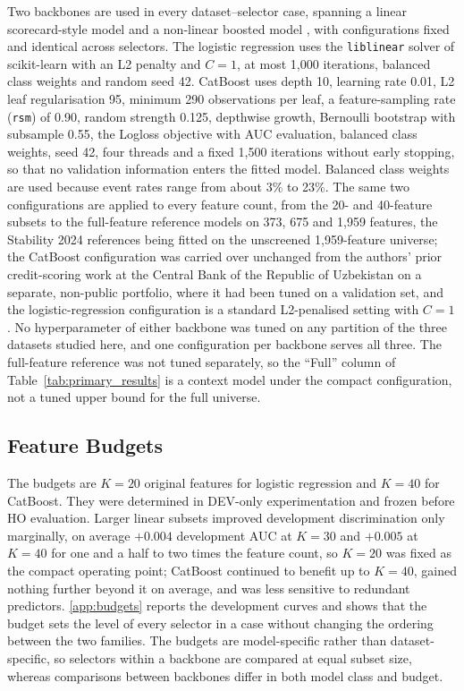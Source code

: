 \documentclass[final,5p,twocolumn]{elsarticle}
\newcommand{\Kfeat}{K}
\begin{document}
Two backbones are used in every dataset--selector case, spanning a linear scorecard-style model and a non-linear boosted model \cite{lessmann2015,gunnarsson2021}, with configurations fixed and identical across selectors. The logistic regression uses the \texttt{liblinear} solver of scikit-learn \cite{pedregosa2011} with an L2 penalty and $C=1$, at most 1,000 iterations, balanced class weights and random seed 42. CatBoost \cite{prokhorenkova2018} uses depth 10, learning rate 0.01, L2 leaf regularisation 95, minimum 290 observations per leaf, a feature-sampling rate (\texttt{rsm}) of 0.90, random strength 0.125, depthwise growth, Bernoulli bootstrap with subsample 0.55, the Logloss objective with AUC evaluation, balanced class weights, seed 42, four threads and a fixed 1,500 iterations without early stopping, so that no validation information enters the fitted model. Balanced class weights are used because event rates range from about 3\% to 23\%. The same two configurations are applied to every feature count, from the 20- and 40-feature subsets to the full-feature reference models on 373, 675 and 1,959 features, the Stability 2024 references being fitted on the unscreened 1,959-feature universe; the CatBoost configuration was carried over unchanged from the authors' prior credit-scoring work at the Central Bank of the Republic of Uzbekistan on a separate, non-public portfolio, where it had been tuned on a validation set, and the logistic-regression configuration is a standard L2-penalised setting with $C=1$. No hyperparameter of either backbone was tuned on any partition of the three datasets studied here, and one configuration per backbone serves all three. The full-feature reference was not tuned separately, so the ``Full'' column of Table~\ref{tab:primary_results} is a context model under the compact configuration, not a tuned upper bound for the full universe.

\subsection{Feature Budgets}
\label{subsec:feature_budgets}

The budgets are $\Kfeat=20$ original features for logistic regression and $\Kfeat=40$ for CatBoost. They were determined in DEV-only experimentation and frozen before HO evaluation. Larger linear subsets improved development discrimination only marginally, on average $+0.004$ development AUC at $\Kfeat=30$ and $+0.005$ at $\Kfeat=40$ for one and a half to two times the feature count, so $\Kfeat=20$ was fixed as the compact operating point; CatBoost continued to benefit up to $\Kfeat=40$, gained nothing further beyond it on average, and was less sensitive to redundant predictors. \ref{app:budgets} reports the development curves and shows that the budget sets the level of every selector in a case without changing the ordering between the two families. The budgets are model-specific rather than dataset-specific, so selectors within a backbone are compared at equal subset size, whereas comparisons between backbones differ in both model class and budget.
\end{document}
